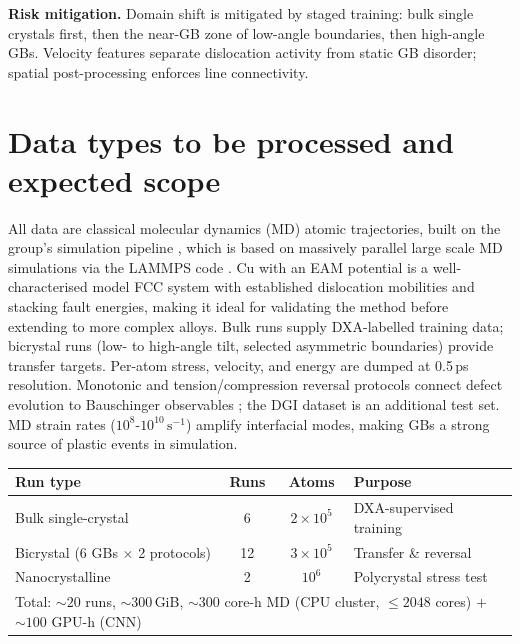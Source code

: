 \documentclass[11pt]{article}
\begin{document}
\textbf{Risk mitigation.}
Domain shift is mitigated by staged training: bulk single crystals first, then the near-GB zone of low-angle boundaries, then high-angle GBs.
Velocity features separate dislocation activity from static GB disorder; spatial post-processing enforces line connectivity.

\section*{Data types to be processed and expected scope}

All data are classical molecular dynamics (MD) atomic trajectories, built on the group's simulation pipeline \cite{Krief2021,Krief2024}, which is based on massively parallel large scale MD simulations via the LAMMPS code \cite{plimpton1995fast}.
Cu with an EAM potential is a well-characterised model FCC system with established dislocation mobilities and stacking fault energies, making it ideal for validating the method before extending to more complex alloys.
Bulk runs supply DXA-labelled training data; bicrystal runs (low- to high-angle tilt, selected asymmetric boundaries) provide transfer targets.
Per-atom stress, velocity, and energy are dumped at 0.5\,ps resolution.
Monotonic and tension/compression reversal protocols connect defect evolution to Bauschinger observables \cite{Gao2022}; the DGI dataset \cite{DGI2025} is an additional test set.
MD strain rates ($10^{8}$-$10^{10}\,\mathrm{s^{-1}}$) amplify interfacial modes, making GBs a strong source of plastic events in simulation.

\begin{center}
\small
\begin{tabular}{|l|c|c|l|}
\hline
\textbf{Run type} & \textbf{Runs} & \textbf{Atoms} & \textbf{Purpose} \\
\hline
Bulk single-crystal & 6 & $2\!\times\!10^{5}$ & DXA-supervised training \\
Bicrystal (6 GBs $\times$ 2 protocols) & 12 & $3\!\times\!10^{5}$ & Transfer \& reversal \\
Nanocrystalline & 2 & $10^{6}$ & Polycrystal stress test \\
\hline
\multicolumn{4}{|l|}{Total: ${\sim}\!20$ runs, ${\sim}\!300$\,GiB, ${\sim}\!300$ core-h MD (CPU cluster, ${\leq}\!2048$ cores) $ + $ ${\sim}\!100$ GPU-h (CNN)} \\
\hline
\end{tabular}
\end{center}
\end{document}
